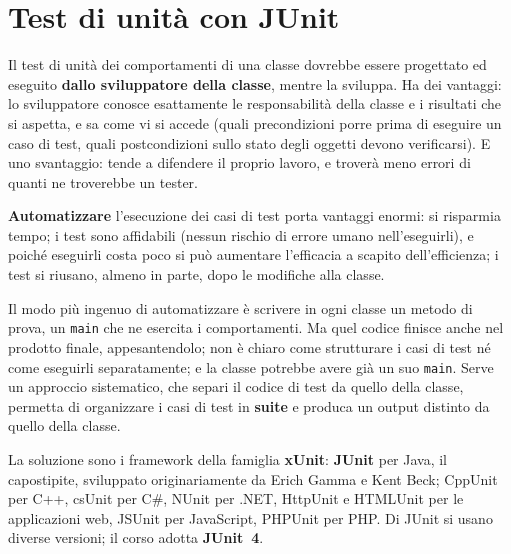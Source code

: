 
\section{Test di unità con JUnit}

Il test di unità dei comportamenti di una classe dovrebbe essere progettato ed eseguito \textbf{dallo sviluppatore della
classe}, mentre la sviluppa. Ha dei vantaggi: lo sviluppatore conosce esattamente le responsabilità della classe e i
risultati che si aspetta, e sa come vi si accede (quali precondizioni porre prima di eseguire un caso di test, quali
postcondizioni sullo stato degli oggetti devono verificarsi). E uno svantaggio: tende a difendere il proprio lavoro, e
troverà meno errori di quanti ne troverebbe un tester.

\textbf{Automatizzare} l'esecuzione dei casi di test porta vantaggi enormi: si risparmia tempo; i test sono affidabili
(nessun rischio di errore umano nell'eseguirli), e poiché eseguirli costa poco si può aumentare l'efficacia a scapito
dell'efficienza; i test si riusano, almeno in parte, dopo le modifiche alla classe.

Il modo più ingenuo di automatizzare è scrivere in ogni classe un metodo di prova, un \texttt{main} che ne esercita i
comportamenti. Ma quel codice finisce anche nel prodotto finale, appesantendolo; non è chiaro come strutturare i casi
di test né come eseguirli separatamente; e la classe potrebbe avere già un suo \texttt{main}. Serve un approccio
sistematico, che separi il codice di test da quello della classe, permetta di organizzare i casi di test in
\textbf{suite} e produca un output distinto da quello della classe.

La soluzione sono i framework della famiglia \textbf{xUnit}: \textbf{JUnit} per Java, il capostipite, sviluppato
originariamente da Erich Gamma e Kent Beck; CppUnit per C++, csUnit per C\#, NUnit per .NET, HttpUnit e HTMLUnit per le
applicazioni web, JSUnit per JavaScript, PHPUnit per PHP. Di JUnit si usano diverse versioni; il corso adotta
\textbf{JUnit~4}.

